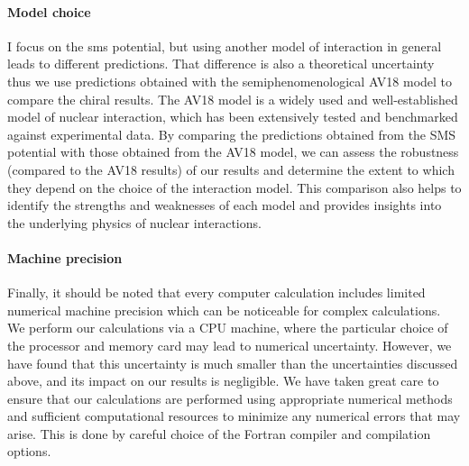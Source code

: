     \paragraph{Model choice}
    I focus on the \gls{sms} potential, but using another model of interaction 
    in general leads to different predictions. That difference is also a theoretical uncertainty thus
    we use predictions obtained with the semiphenomenological AV18 model to compare the chiral results.
    The AV18 model is a widely used and well-established model of nuclear interaction,
    which has been extensively tested and benchmarked against experimental data. By comparing
    the predictions obtained from the SMS potential with those obtained from the AV18 model,
    we can assess the robustness (compared to the AV18 results) of our results and determine the extent to which they depend
    on the choice of the interaction model. This comparison also helps to identify the strengths
    and weaknesses of each model and provides insights into the underlying physics of nuclear interactions.

    \paragraph{Machine precision}

    Finally, it should be noted that every computer calculation includes limited numerical machine precision which
    can be noticeable for complex calculations. We perform our calculations via a CPU machine, where the particular
    choice of the processor and memory card may lead to numerical uncertainty. However, we have found that this
    uncertainty is much smaller than the uncertainties discussed above, and its impact on our results is
    negligible. We have taken great care to ensure that our calculations are performed using appropriate numerical
    methods and sufficient computational resources to minimize any numerical errors that may arise.
    This is done by careful choice of the Fortran compiler and compilation options. 
